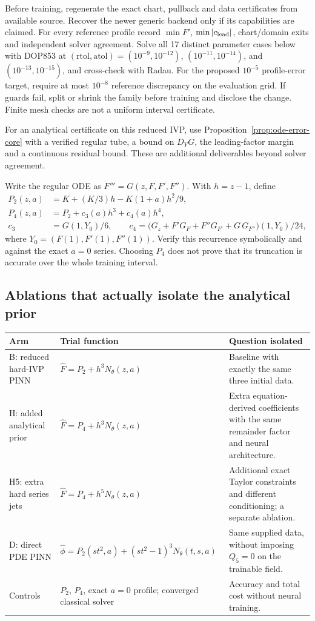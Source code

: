 Before training, regenerate the exact chart, pullback and data certificates
from available source. Recover the newer generic backend only if its
capabilities are claimed. For every reference profile record
$\min F'$, $\min|c_{\rm lead}|$, chart/domain exits and independent solver
agreement. Solve all 17 distinct parameter cases below with DOP853 at
$(\mathrm{rtol},\mathrm{atol})=(10^{-9},10^{-12})$,
$(10^{-11},10^{-14})$, and $(10^{-13},10^{-15})$, and cross-check with Radau.
For the proposed $10^{-5}$ profile-error target, require at most $10^{-8}$
reference discrepancy on the evaluation grid. If guards fail, split or
shrink the family before training and disclose the change. Finite mesh
checks are not a uniform interval certificate.

For an analytical certificate on this reduced IVP, use
Proposition~\ref{prop:ode-error-core} with a verified regular tube,
a bound on $D_YG$, the leading-factor margin and a continuous residual
bound. These are additional deliverables beyond solver agreement.

Write the regular ODE as $F'''=G(z,F,F',F'')$. With $h=z-1$, define
\begin{align}
 P_2(z,a)&=K+(K/3)h-K(1+a)h^2/9,\\
 P_4(z,a)&=P_2+c_3(a)h^3+c_4(a)h^4,\label{eq:experiment-priors}\\
 c_3&=G(1,Y_0)/6,\qquad
 c_4=\bigl(G_z+F'G_F+F''G_{F'}+G\,G_{F''}\bigr)(1,Y_0)/24,\nonumber
\end{align}
where $Y_0=(F(1),F'(1),F''(1))$. Verify this recurrence symbolically and
against the exact $a=0$ series. Choosing $P_4$ does not prove that its
truncation is accurate over the whole training interval.

\subsection{Ablations that actually isolate the analytical prior}
\begin{center}\small
\renewcommand{\arraystretch}{1.16}
\begin{tabularx}{\linewidth}{@{}p{3cm}p{5.1cm}X@{}}
\toprule
Arm & Trial function & Question isolated \\
\midrule
B: reduced hard-IVP PINN & $\widehat F=P_2+h^3N_\theta(z,a)$ & Baseline with exactly the same three initial data. \\
H: added analytical prior & $\widehat F=P_4+h^3N_\theta(z,a)$ & Extra equation-derived coefficients with the same remainder factor and neural architecture. \\
H5: extra hard series jets & $\widehat F=P_4+h^5N_\theta(z,a)$ & Additional exact Taylor constraints and different conditioning; a separate ablation. \\
D: direct PDE PINN & $\widehat\phi=P_2(st^2,a)+(st^2-1)^3N_\theta(t,s,a)$ & Same supplied data, without imposing $Q_5=0$ on the trainable field. \\
Controls & $P_2$, $P_4$, exact $a=0$ profile; converged classical solver & Accuracy and total cost without neural training. \\
\bottomrule
\end{tabularx}
\end{center}

